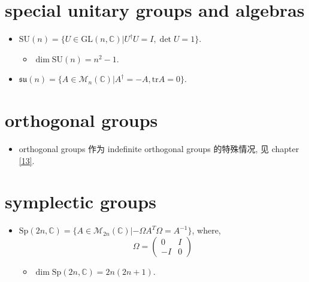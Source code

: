\section{special unitary groups and algebras}
\begin{itemize}
	\item $\mathrm{SU}(n) = \{U \in \mathrm{GL}(n, \mathbb{C}) | U^\dag U = I, \det U = 1\}$.
	\begin{itemize}
		\item $\dim \mathrm{SU}(n) = n^2 - 1$.
	\end{itemize}
	
	\item $\mathfrak{su}(n) = \{A \in \mathcal{M}_n(\mathbb{C}) | A^\dag = - A, \mathrm{tr} A = 0\}$.
\end{itemize}

\section{orthogonal groups}
\begin{itemize}
	\item orthogonal groups 作为 indefinite orthogonal groups 的特殊情况, 见 chapter \ref{13}.
\end{itemize}

\section{symplectic groups}
\begin{itemize}
	\item $\mathrm{Sp}(2 n, \mathbb{C}) = \{A \in \mathcal{M}_{2 n}(\mathbb{C}) | - \Omega A^T \Omega = A^{- 1}\}$, where,
	\begin{equation}
		\Omega = \begin{pmatrix}
			0 & I \\
			- I & 0
		\end{pmatrix}
	\end{equation}
	\begin{itemize}
		\item $\dim \mathrm{Sp}(2 n, \mathbb{C}) = 2 n (2 n + 1)$.
	\end{itemize}
\end{itemize}
